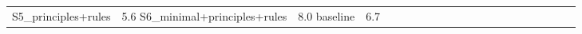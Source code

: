 \begin{tabular}{lllllllllllllllllllll}
S5_principles+rules & 5.6%
S6_minimal+principles+rules & 8.0%
baseline & 6.7%
\bottomrule
\end{tabular}
